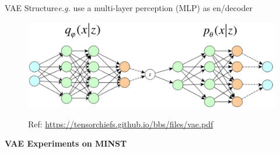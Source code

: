 \documentclass{beamer}
\begin{document}
\begin{frame}{VAE Structure}{\textit{e.g.} use a multi-layer perception (MLP) as en/decoder}
\begin{figure}
\includegraphics[width=0.9\columnwidth]{exp/vae-str.png}%
\begin{spacing}{1.5}
{\textcolor{BGpurple}
{\small Ref: \url{https://tensorchiefs.github.io/bbs/files/vae.pdf}}}
\end{spacing}
\end{figure}
\end{frame}
{%
\begin{frame}
\begin{center}
{\bf\LARGE VAE Experiments on MINST}
\end{center}
\end{frame}
}%
\end{document}

